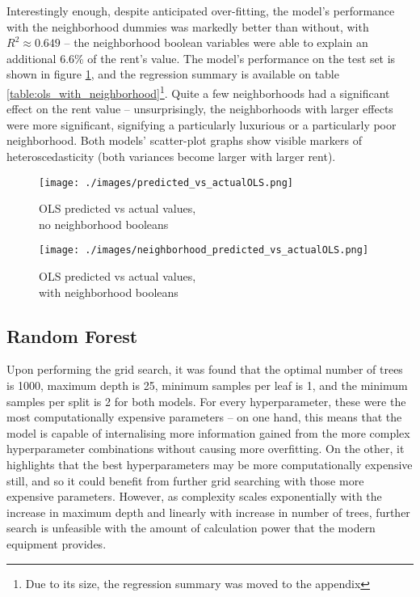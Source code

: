 \documentclass[12pt]{report}
\begin{document}
Interestingly enough, despite anticipated over-fitting, the model's performance with the neighborhood dummies was markedly better than without, with $R^2\approx0.649$ -- the neighborhood boolean variables were able to explain an additional 6.6\% of the rent's value. The model's performance on the test set is shown in figure \ref{fig:ols-scatterplot-neighborhood}, and the regression summary is available on table \ref{table:ols_with_neighborhood}\footnote{Due to its size, the regression summary was moved to the appendix}. Quite a few neighborhoods had a significant effect on the rent value -- unsurprisingly, the neighborhoods with larger effects were more significant, signifying a particularly luxurious or a particularly poor neighborhood. Both models' scatter-plot graphs show visible markers of heteroscedasticity (both variances become larger with larger rent).

\begin{figure}[H]
	\begin{minipage}{0.4778\textwidth}
		\centering
		\texttt{[image: ./images/predicted\_vs\_actualOLS.png]}
		\caption{OLS predicted vs actual values, \\ no neighborhood booleans}
		\label{fig:ols-scatterplot}
	\end{minipage}
	\begin{minipage}{0.48\textwidth}
		\centering
		\texttt{[image: ./images/neighborhood\_predicted\_vs\_actualOLS.png]}
		\caption{OLS predicted vs actual values, \\ with neighborhood booleans}
		\label{fig:ols-scatterplot-neighborhood}
	\end{minipage}
\end{figure}

\subsection{Random Forest}
Upon performing the grid search, it was found that the optimal number of trees is 1000, maximum depth is 25, minimum samples per leaf is 1, and the minimum samples per split is 2 for both models. For every hyperparameter, these were the most computationally expensive parameters -- on one hand, this means that the model is capable of internalising more information  gained from the more complex hyperparameter combinations without causing more overfitting. On the other, it highlights that the best hyperparameters may be more computationally expensive still, and so it could benefit from further grid searching with those more expensive parameters. However, as complexity scales exponentially with the increase in maximum depth and linearly with increase in number of trees, further search is unfeasible with the amount of calculation power that the modern equipment provides.
\end{document}
